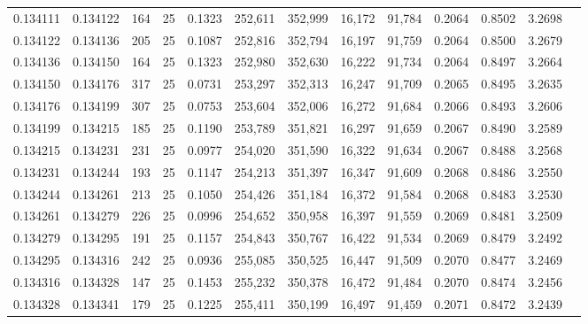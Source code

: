 \begin{tabular}{rrrrrrrrrrrrr}
0.134111 & 0.134122 &   164 &  25 &                                     0.1323 & 252,611 & 352,999 &  16,172 &  91,784 & 0.2064 & 0.8502 & 3.2698 \\
0.134122 & 0.134136 &   205 &  25 &                                     0.1087 & 252,816 & 352,794 &  16,197 &  91,759 & 0.2064 & 0.8500 & 3.2679 \\
0.134136 & 0.134150 &   164 &  25 &                                     0.1323 & 252,980 & 352,630 &  16,222 &  91,734 & 0.2064 & 0.8497 & 3.2664 \\
0.134150 & 0.134176 &   317 &  25 &                                     0.0731 & 253,297 & 352,313 &  16,247 &  91,709 & 0.2065 & 0.8495 & 3.2635 \\
0.134176 & 0.134199 &   307 &  25 &                                     0.0753 & 253,604 & 352,006 &  16,272 &  91,684 & 0.2066 & 0.8493 & 3.2606 \\
0.134199 & 0.134215 &   185 &  25 &                                     0.1190 & 253,789 & 351,821 &  16,297 &  91,659 & 0.2067 & 0.8490 & 3.2589 \\
0.134215 & 0.134231 &   231 &  25 &                                     0.0977 & 254,020 & 351,590 &  16,322 &  91,634 & 0.2067 & 0.8488 & 3.2568 \\
0.134231 & 0.134244 &   193 &  25 &                                     0.1147 & 254,213 & 351,397 &  16,347 &  91,609 & 0.2068 & 0.8486 & 3.2550 \\
0.134244 & 0.134261 &   213 &  25 &                                     0.1050 & 254,426 & 351,184 &  16,372 &  91,584 & 0.2068 & 0.8483 & 3.2530 \\
0.134261 & 0.134279 &   226 &  25 &                                     0.0996 & 254,652 & 350,958 &  16,397 &  91,559 & 0.2069 & 0.8481 & 3.2509 \\
0.134279 & 0.134295 &   191 &  25 &                                     0.1157 & 254,843 & 350,767 &  16,422 &  91,534 & 0.2069 & 0.8479 & 3.2492 \\
0.134295 & 0.134316 &   242 &  25 &                                     0.0936 & 255,085 & 350,525 &  16,447 &  91,509 & 0.2070 & 0.8477 & 3.2469 \\
0.134316 & 0.134328 &   147 &  25 &                                     0.1453 & 255,232 & 350,378 &  16,472 &  91,484 & 0.2070 & 0.8474 & 3.2456 \\
0.134328 & 0.134341 &   179 &  25 &                                     0.1225 & 255,411 & 350,199 &  16,497 &  91,459 & 0.2071 & 0.8472 & 3.2439 \\

\end{tabular}
